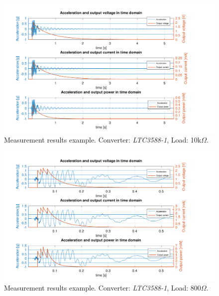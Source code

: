 \documentclass[12pt,a4paper]{article}
\begin{document}
\begin{landscape} 
\begin{figure}[ht!]
\includegraphics[scale=1.05]{timedomainltc358810k.pdf}
\caption{Measurement results example. Converter: \textit{LTC3588-1}, Load: 10k$\Omega$.}
\label{fig:timedomainltc358810k}
\end{figure}
\end{landscape}

\begin{landscape} 
\begin{figure}[ht!]
\includegraphics[scale=1.05]{timedomainltc3331800.pdf}
\caption{Measurement results example. Converter: \textit{LTC3588-1}, Load: 800$\Omega$.}
\label{fig:timedomainltc3331800}
\end{figure}
\end{landscape}
\end{document}
